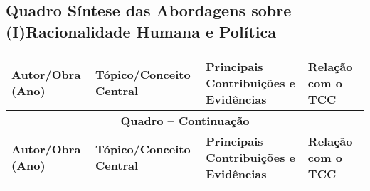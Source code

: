 

\begin{apendicesenv}




\chapter{Quadro Síntese das Abordagens sobre (I)Racionalidade Humana e Política}

\label{apendice:quadro_iracionalidade}

\begin{quadro}[htbp]
\caption{Quadro Síntese – (I)Racionalidade Humana e Política: Principais Abordagens}

\begin{longtable}{p{} p{} p{} p{}}
\toprule
\textbf{Autor/Obra (Ano)} & \textbf{Tópico/Conceito Central} & \textbf{Principais Contribuições e Evidências} & \textbf{Relação com o TCC} \\
\midrule
\endfirsthead
\multicolumn{4}{c}{\textbf{Quadro – Continuação}} \\
\toprule
\textbf{Autor/Obra (Ano)} & \textbf{Tópico/Conceito Central} & \textbf{Principais Contribuições e Evidências} & \textbf{Relação com o TCC} \\
\midrule
\endhead


\end{longtable}
\end{quadro}
\end{apendicesenv}
